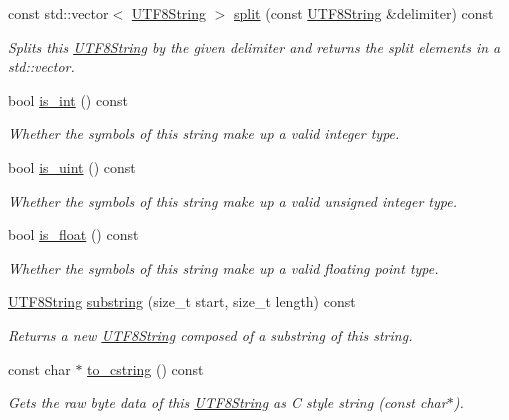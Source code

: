 \begin{DoxyCompactItemize}
const std\-::vector$<$ \hyperlink{classchaos_1_1str_1_1_u_t_f8_string}{U\-T\-F8\-String} $>$ \hyperlink{classchaos_1_1str_1_1_u_t_f8_string_ac5da4c989f6394c38b0fb82a252099db}{split} (const \hyperlink{classchaos_1_1str_1_1_u_t_f8_string}{U\-T\-F8\-String} \&delimiter) const 
\begin{DoxyCompactList}\small\item\em Splits this \hyperlink{classchaos_1_1str_1_1_u_t_f8_string}{U\-T\-F8\-String} by the given delimiter and returns the split elements in a std\-::vector. \end{DoxyCompactList}\item 
bool \hyperlink{classchaos_1_1str_1_1_u_t_f8_string_a64f529f30034281560805b97826c5e13}{is\-\_\-int} () const 
\begin{DoxyCompactList}\small\item\em Whether the symbols of this string make up a valid integer type. \end{DoxyCompactList}\item 
bool \hyperlink{classchaos_1_1str_1_1_u_t_f8_string_a989763da3e7eed8664cd2e5c41ea7e00}{is\-\_\-uint} () const 
\begin{DoxyCompactList}\small\item\em Whether the symbols of this string make up a valid unsigned integer type. \end{DoxyCompactList}\item 
bool \hyperlink{classchaos_1_1str_1_1_u_t_f8_string_a2fbd69fb90a390df37c119577d4d3c6a}{is\-\_\-float} () const 
\begin{DoxyCompactList}\small\item\em Whether the symbols of this string make up a valid floating point type. \end{DoxyCompactList}\item 
\hyperlink{classchaos_1_1str_1_1_u_t_f8_string}{U\-T\-F8\-String} \hyperlink{classchaos_1_1str_1_1_u_t_f8_string_a2d50ab58715264ae175f521816bf670c}{substring} (size\-\_\-t start, size\-\_\-t length) const 
\begin{DoxyCompactList}\small\item\em Returns a new \hyperlink{classchaos_1_1str_1_1_u_t_f8_string}{U\-T\-F8\-String} composed of a substring of this string. \end{DoxyCompactList}\item 
const char $\ast$ \hyperlink{classchaos_1_1str_1_1_u_t_f8_string_aa6fd66af34d7a3c4a495860952e97557}{to\-\_\-cstring} () const 
\begin{DoxyCompactList}\small\item\em Gets the raw byte data of this \hyperlink{classchaos_1_1str_1_1_u_t_f8_string}{U\-T\-F8\-String} as C style string ({\ttfamily const char$\ast$}). \end{DoxyCompactList}\item 

\end{DoxyCompactItemize}
